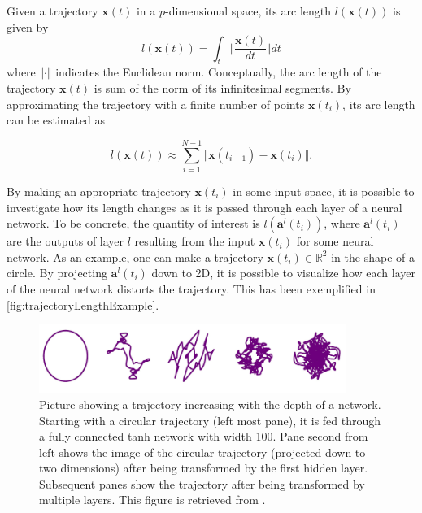 Given a trajectory $\boldsymbol{x}(t)$ in a $p$-dimensional space, its arc length 
$l(\boldsymbol{x}(t))$ is given by
\begin{equation}
   l(\boldsymbol{x}(t)) = 
   \int_{t} \big\Vert \frac{\boldsymbol{x}(t)}{dt} \big\Vert dt
\end{equation}
where $\Vert \cdot\Vert$ indicates the Euclidean norm. Conceptually, the arc length of the trajectory $\boldsymbol{x}(t)$ is sum of the norm of its infinitesimal segments. By approximating the trajectory with a finite number of points $\boldsymbol{x}(t_i)$, its arc length can be estimated as 

\begin{equation}\label{eq:TrajectoryLengthDiscrete}
   l(\boldsymbol{x}(t)) \approx 
   \sum_{i=1}^{N-1} \Vert\boldsymbol{x}(t_{i+1}) - \boldsymbol{x}(t_{i})\Vert.
\end{equation}

By making an appropriate trajectory $\boldsymbol{x}(t_i)$ in some input space, it is possible to investigate how its length changes as it is passed through each layer of a neural network. To be concrete, the quantity of interest is $l(\boldsymbol{a}^{l}(t_i))$, where $\boldsymbol{a}^{l}(t_i)$ are the outputs of layer $l$ resulting from the input $\boldsymbol{x}(t_i)$ for some neural network. As an example, one can make a trajectory $\boldsymbol{x}(t_i) \in \mathbb{R}^2$ in the shape of a circle. By projecting $\boldsymbol{a}^{l}(t_i)$ down to 2D, it is possible to visualize how each layer of the neural network distorts the trajectory. This has been exemplified in \autoref{fig:trajectoryLengthExample}.

\begin{figure}[H]
    \centering
    \includegraphics[width=10cm]{latex/figures/trajectoryLengthExample.PNG}
    \caption{Picture showing a trajectory increasing with the depth
of a network. Starting with a circular trajectory (left most
pane), it is fed through a fully connected tanh network with
width 100. Pane second from left shows the image of the circular
trajectory (projected down to two dimensions) after being transformed by the first hidden layer. Subsequent panes show the trajectory after being transformed by multiple layers. This figure is retrieved from \citet{raghu2017expressive}.}
\label{fig:trajectoryLengthExample}
\end{figure}

